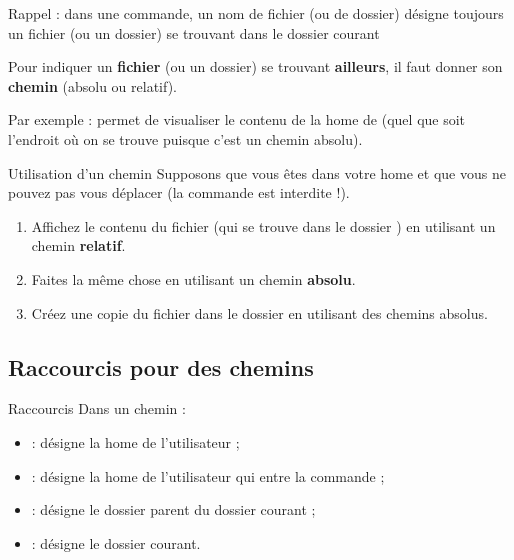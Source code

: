\documentclass[a4paper,11pt]{style-esi/td}
\begin{document}
		\begin{infobox}
			Rappel : dans une commande, un nom de fichier (ou de dossier)
			désigne toujours un fichier (ou un dossier) se trouvant
			dans le dossier courant
	
			Pour indiquer un \textbf{fichier} (ou un dossier) 
			se trouvant \textbf{ailleurs},
			il faut donner son \textbf{chemin} (absolu ou relatif).
		\end{infobox}

		Par exemple : 
		permet de visualiser le contenu de la home de 
		(quel que soit l'endroit où on se trouve puisque c'est un chemin absolu).
		
		\begin{Exercice}{Utilisation d'un chemin}
			Supposons que vous êtes dans votre home 
			et que vous ne pouvez pas vous déplacer 
			(la commande  est interdite !).
			\begin{enumerate}
			\item 
				Affichez le contenu du fichier 
				(qui se trouve dans le dossier )
				en utilisant un chemin \textbf{relatif}.
			\item 
				Faites la même chose 
				en utilisant un chemin \textbf{absolu}.
			\item
				Créez une copie du fichier  
				dans le dossier 
				en utilisant des chemins absolus.
			\end{enumerate}
		\end{Exercice}

	\subsection{Raccourcis pour des chemins}

		\begin{theorie}{Raccourcis}
			Dans un chemin :
			\begin{itemize}
			\item {} : désigne la home de l'utilisateur  ;
			\item \samp{\textasciitilde{}} : désigne la home de l'utilisateur qui entre la commande ;
			\item {} : désigne le dossier parent du dossier courant ;
			\item {} : désigne le dossier courant.
			\end{itemize}
		\end{theorie}
\end{document}
